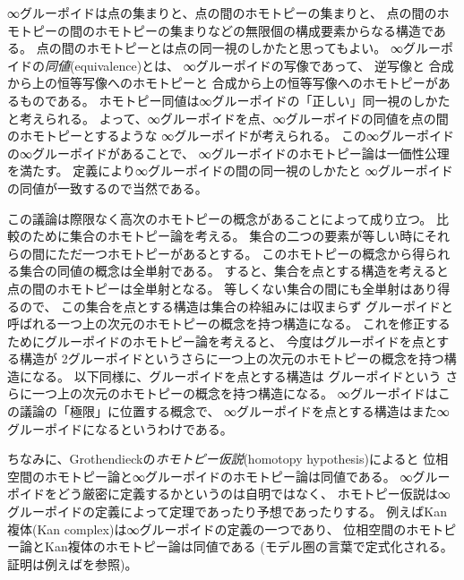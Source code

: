 \documentclass[index]{subfiles}
\begin{document}
∞グルーポイドは点の集まりと、点の間のホモトピーの集まりと、
点の間のホモトピーの間のホモトピーの集まりなどの無限個の構成要素からなる構造である。
点の間のホモトピーとは点の同一視のしかたと思ってもよい。
∞グルーポイドの\emph{同値}(equivalence)とは、
∞グルーポイドの写像であって、
逆写像と
合成から上の恒等写像へのホモトピーと
合成から上の恒等写像へのホモトピーがあるものである。
ホモトピー同値は∞グルーポイドの「正しい」同一視のしかたと考えられる。
よって、∞グルーポイドを点、∞グルーポイドの同値を点の間のホモトピーとするような
∞グルーポイドが考えられる。
この∞グルーポイドの∞グルーポイドがあることで、
∞グルーポイドのホモトピー論は一価性公理を満たす。
定義により∞グルーポイドの間の同一視のしかたと
∞グルーポイドの同値が一致するので当然である。

この議論は際限なく高次のホモトピーの概念があることによって成り立つ。
比較のために集合のホモトピー論を考える。
集合の二つの要素が等しい時にそれらの間にただ一つホモトピーがあるとする。
このホモトピーの概念から得られる集合の同値の概念は全単射である。
すると、集合を点とする構造を考えると点の間のホモトピーは全単射となる。
等しくない集合の間にも全単射はあり得るので、
この集合を点とする構造は集合の枠組みには収まらず
グルーポイドと呼ばれる一つ上の次元のホモトピーの概念を持つ構造になる。
これを修正するためにグルーポイドのホモトピー論を考えると、
今度はグルーポイドを点とする構造が
2グルーポイドというさらに一つ上の次元のホモトピーの概念を持つ構造になる。
以下同様に、グルーポイドを点とする構造は
グルーポイドという
さらに一つ上の次元のホモトピーの概念を持つ構造になる。
∞グルーポイドはこの議論の「極限」に位置する概念で、
∞グルーポイドを点とする構造はまた∞グルーポイドになるというわけである。

ちなみに、Grothendieckの\emph{ホモトピー仮説}(homotopy hypothesis)によると
位相空間のホモトピー論と∞グルーポイドのホモトピー論は同値である。
∞グルーポイドをどう厳密に定義するかというのは自明ではなく、
ホモトピー仮説は∞グルーポイドの定義によって定理であったり予想であったりする。
例えばKan複体(Kan complex)は∞グルーポイドの定義の一つであり、
位相空間のホモトピー論とKan複体のホモトピー論は同値である
(モデル圏の言葉で定式化される。
証明は例えばを参照)。
\end{document}
